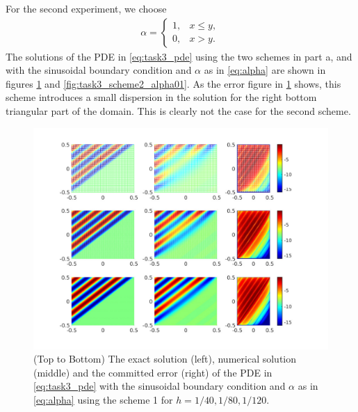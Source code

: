 \documentclass[10pt,a4paper,twoside, french]{article}
\numberwithin{equation}{section}
\numberwithin{figure}{section}
\numberwithin{table}{section}
\begin{document}
\begin{enumerate}
\begin{enumerate}[a.]
For the second experiment, we choose 
\begin{align}
\alpha=\left\lbrace
\begin{array}{cc}
1, & x\leq y,\\
0, & x> y.
\end{array}\right.
\label{eq:alpha}
\end{align}
The solutions of the PDE in \eqref{eq:task3_pde} using the two schemes in part a, and with the sinusoidal boundary condition and $\alpha$ as in \eqref{eq:alpha} are shown in figures \ref{fig:task3_scheme1_alpha01} and \ref{fig:task3_scheme2_alpha01}. As the error figure in \ref{fig:task3_scheme1_alpha01} shows, this scheme introduces a small dispersion in the solution for the right bottom triangular part of the domain. This is clearly not the case for the second scheme.
\begin{figure}[h]
\centering
\includegraphics[scale=.8]{fig/task3_scheme1_a10_N_40_80_120}
\caption{(Top to Bottom) The exact solution (left), numerical solution (middle) and the committed error (right) of the PDE in \eqref{eq:task3_pde} with the sinusoidal boundary condition and $\alpha$ as in \eqref{eq:alpha} using the scheme 1 for $h = 1/40, 1/80, 1/120$.}
\label{fig:task3_scheme1_alpha01}
\end{figure}
\begin{figure}[h]
\centering

\end{figure}
\end{enumerate}
\end{enumerate}
\end{document}
